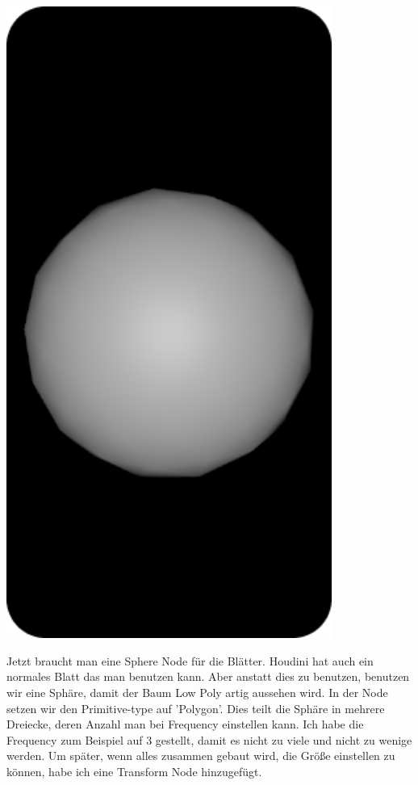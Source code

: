 \documentclass[paper=a4,fontsize=12pt,ngerman]{scrartcl}
\begin{document}
	\begin{minipage}{0.3\textwidth}
		\includegraphics[width=0.8\textwidth]{graphics/Ali6.png}
	\end{minipage}
	\begin{minipage}{0.7\textwidth}
	Jetzt braucht man eine Sphere Node für die Blätter. Houdini hat auch ein normales Blatt das man benutzen kann. Aber anstatt dies zu benutzen, benutzen wir eine Sphäre, damit der Baum Low Poly artig aussehen wird. In der Node setzen wir den Primitive-type auf 'Polygon'. Dies teilt die Sphäre in mehrere Dreiecke, deren Anzahl man bei Frequency einstellen kann. Ich habe die Frequency zum Beispiel auf 3 gestellt, damit es nicht zu viele und nicht zu wenige werden. Um später, wenn alles zusammen gebaut wird, die Größe einstellen zu können, habe ich eine Transform Node hinzugefügt.
	\end{minipage}
\end{document}
